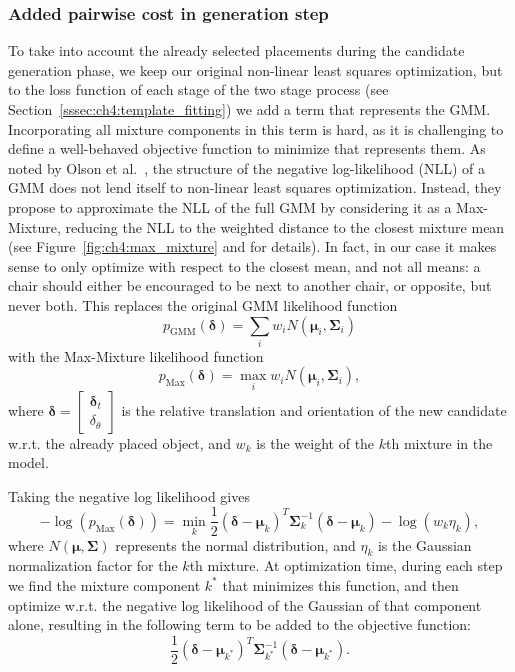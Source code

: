 \documentclass[10pt,twocolumn,letterpaper]{article}
\newcommand{\bb}[1]{{\bm{#1}}}
\begin{document}
\subsubsection{Added pairwise cost in generation step}
To take into account the already selected placements during the candidate
generation phase, we keep our original non-linear least squares optimization,
but to the loss function of each stage of the two stage process (see
Section~\ref{sssec:ch4:template_fitting}) we add a term that represents the
GMM.  Incorporating all mixture components in this
term is hard, as it is challenging to define a well-behaved objective function to minimize that
represents them. As noted by Olson et al.~\cite{Olson:2013:IJRR}, the
structure of the negative log-likelihood (NLL) of a GMM does not lend itself to
non-linear least squares optimization. Instead, they propose to approximate the
NLL of the full GMM by considering it as a Max-Mixture, reducing the NLL to the
weighted distance to the closest mixture mean (see Figure~\ref{fig:ch4:max_mixture} and \cite{Olson:2013:IJRR} for
details).  In fact, in our case it makes sense to only optimize with respect to
the closest mean, and not all means: a chair should either be encouraged to be
next to another chair, or opposite, but never both. This replaces the original GMM likelihood function
%
\[ p_\mathrm{GMM}(\bb{\delta}) = \sum_i w_i N(\bb{\mu}_i, \bb{\Sigma}_i) \]
%
with the Max-Mixture likelihood function
%
\[ p_\mathrm{Max}(\bb{\delta}) = \max_i w_i N(\bb{\mu}_i, \bb{\Sigma}_i), \]
%
where $\bb{\delta} = \begin{bmatrix} \bb{\delta}_t \\ \delta_\theta
\end{bmatrix}$ is the relative translation and orientation of the new candidate
w.r.t. the already placed object, and $w_k$ is the weight of the $k$th mixture in
the model.

Taking the negative log likelihood gives 
%
\[ -\log(p_\mathrm{Max}(\bb{\delta})) = \min_k \frac{1}{2} (\bb{\delta} - \bb{\mu}_k)^T \bb{\Sigma}_k^{-1}(\bb{\delta} - \bb{\mu}_k) - \log(w_k\eta_k), \]
%
where $N(\bb{\mu}, \bb{\Sigma})$ represents the normal distribution, and $\eta_k$ is the Gaussian normalization factor for the $k$th mixture. At
optimization time, during each step we find the mixture component $k^*$ that
minimizes this function, and then optimize w.r.t. the negative log likelihood
of the Gaussian of that component alone, resulting in the following term to be added to the objective function:
\[ \frac{1}{2} (\bb{\delta} - \bb{\mu}_{k^*})^T \bb{\Sigma}_{k^*}^{-1}(\bb{\delta} - \bb{\mu}_{k^*}). \]
\end{document}
